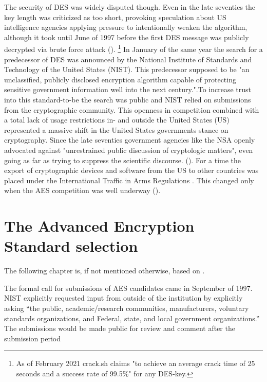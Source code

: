 The security of DES was widely disputed though. Even in the late seventies the key length was criticized as too short, provoking speculation about US intelligence agencies applying pressure to intentionally weaken the algorithm, although it took until June of 1997 before the first DES message was publicly decrypted via brute force attack (\cite[p.112]{appcrypt}). \footnote{As of February 2021 crack.sh claims "to achieve an average crack time of 25 seconds and a success rate of 99.5\%" for any DES-key.} In January of the same year the search for a predecessor of DES was announced by the National Institute of Standards and Technology of the United States (NIST). This predecessor supposed to be "an unclassified, publicly disclosed encryption algorithm capable of protecting sensitive government information well into the next century."\cite[p. 1]{announcementrequest}.To increase trust into this standard-to-be the search was public and NIST relied on submissions from the cryptographic community.
This openness in competition combined with a total lack of usage restrictions in- and outside the United States (US) represented a massive shift in the United States governments stance on cryptography. 
Since the late seventies government agencies like the NSA openly advocated against "unrestrained public discussion of cryptologic matters", even going as far as trying to suppress the scientific discourse. (\cite[p. 151-152]{cyberhist}). For a time the export of cryptographic devices and software from the US to other countries was placed under the International Traffic in Arms Regulations \cite[Category XIII--Auxiliary Military Equipment $(1)$]{armslaw} . This changed only when the AES competition was well underway (\cite{revisedlaw}).

\section{The Advanced Encryption Standard selection}
\label{ch:aes-selection}

The following chapter is, if not mentioned otherwise, based on \cite{nistdevoverview}.

The formal call for submissions of AES candidates came in September of 1997. NIST explicitly requested input from outside of the institution by explicitly asking \enquote{the public, academic/research communities, manufacturers, voluntary standards organizations, and Federal, state, and local government organizations.} The submissions would be made public for review and comment after the submission period

